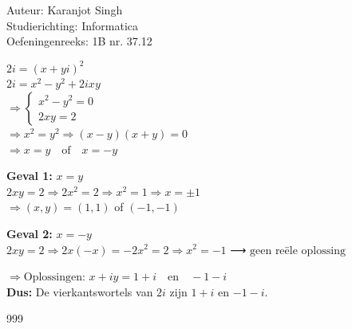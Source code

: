 \documentclass[a4paper]{article}
\begin{document}
	
\noindent \large Auteur: Karanjot Singh \\
\noindent \large Studierichting: Informatica\\
\noindent \large Oefeningenreeks: 1B nr. 37.12\\
	
\normalsize
	
$2i = (x + yi)^2$ \\

$2i = x^2 - y^2 + 2ixy$ \\

$\Rightarrow
\left\{
\begin{array}{l}
x^2 - y^2 = 0 \\
2xy = 2
\end{array}
\right.$ \\

$\Rightarrow x^2 = y^2 \Rightarrow (x - y)(x + y) = 0$ \\

$\Rightarrow x = y \quad \text{of} \quad x = -y$ \\

\vspace{0.3em}

\textbf{Geval 1: } $x = y$ \\

$2xy = 2 \Rightarrow 2x^2 = 2 \Rightarrow x^2 = 1 \Rightarrow x = \pm 1$ \\

$\Rightarrow (x, y) = (1, 1)$ of $(-1, -1)$ \\

\vspace{0.3em}

\textbf{Geval 2: } $x = -y$ \\

$2xy = 2 \Rightarrow 2x(-x) = -2x^2 = 2 \Rightarrow x^2 = -1$ ⟶ $\text{geen reële oplossing}$ \\

\vspace{0.3em}

$\Rightarrow \text{Oplossingen: } x + iy = 1 + i \quad \text{en} \quad -1 - i$ \\

\textbf{Dus:} De vierkantswortels van $2i$ zijn $1 + i$ en $-1 - i$. \\

\begin{thebibliography}{999}
\end{thebibliography} 
\end{document}
